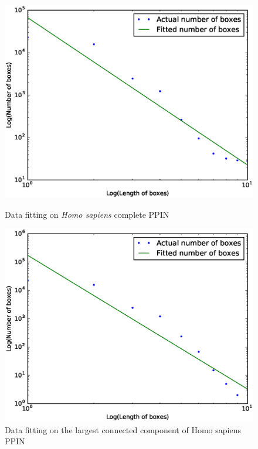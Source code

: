 \begin{figure}[h]
	\begin{minipage}{0.45\textwidth}
    	\centering
		\includegraphics[width=\textwidth]{Graphics/Homo_sapiens_WG.eps}
        \caption{Data fitting on \textit{Homo sapiens} complete PPIN}
        \label{fig:HSWG}
	\end{minipage}
	\begin{minipage}{0.45\textwidth}
		\centering
		\includegraphics[width=\textwidth]{Graphics/Homo_sapiens_LCC.eps}
        \caption{Data fitting on the largest connected component of Homo sapiens PPIN}
		\label{fig:HSLCC}
	\end{minipage}
\end{figure}


